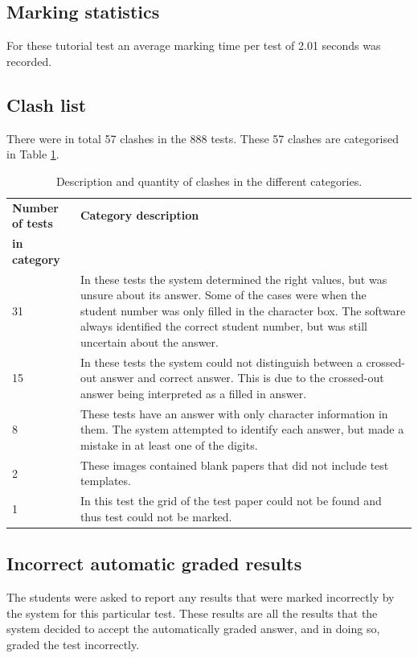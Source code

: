 \subsection{Marking statistics}

For these tutorial test an average marking time per test of 2.01 seconds was recorded.

\subsection{Clash list}

There were in total 57 clashes in the 888 tests. These 57 clashes are categorised in Table \ref{tbl:TutClash}.
\begin{table}
  \centering
  \caption{Description and quantity of clashes in the different categories.} \label{tbl:TutClash}
\begin{tabular}{|p{3cm}|p{8cm}|}
\hline
\textbf{Number of tests} & \textbf{Category description}\\
\textbf{in category} &\\
\hline
31&In these tests the system determined the right values, but was unsure about its answer. Some of the cases were when the student number was only filled in the character box. The software always identified the correct student number, but was still uncertain about the answer.\\
\hline
15&In these tests the system could not distinguish between a crossed-out answer and correct answer. This is due to the crossed-out answer being interpreted as a filled in answer.\\
\hline
8&These tests have an answer with only character information in them. The system attempted to identify each answer, but made a mistake in at least one of the digits.\\
\hline
2&These images contained blank papers that did not include test templates.\\
\hline
1&In this test the grid of the test paper could not be found and thus test could not be marked.\\
\hline
\end{tabular}
\end{table}

\subsection{Incorrect automatic graded results}

The students were asked to report any results that were marked incorrectly by the system for this particular test. These results are all the results that the system decided to accept the automatically graded answer, and in doing so, graded the test incorrectly.

